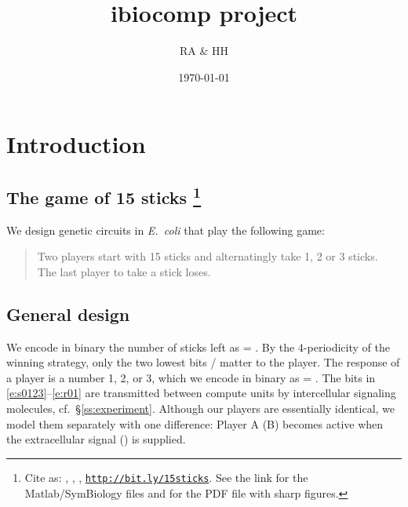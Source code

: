 \documentclass[12pt,notitlepage]{article}
\title{ibiocomp project}
\author{RA \& HH}
\date{\today}
\def\[#1\]{\begin{align}#1\end{align}}
\newcommand{\ra}[1]{{\color{Blue}#1}}
\newcommand{\linktodoc}{http://bit.ly/15sticks}
\begin{document}
\maketitle

\section{Introduction}

\subsection{The game of 15 sticks%
	\footnote{%
		Cite as:
		\MyTitle, \MyAuthor, \MyDate,
		\href{\linktodoc}{{\texttt{\linktodoc}}}.
		See the link 
		for the Matlab/SymBiology files
		and 
		for the PDF file with sharp figures.%
	}%
}


We design genetic circuits
\ra{in \emph{E.~coli}}
that play the following game:
%
\begin{quote}
	Two players start with 15 sticks
	and alternatingly 
	take 1, 2 or 3 sticks.
	\\
	The last player to take a stick loses.
\end{quote}



%



\subsection{General design} \label{s:general}

We encode in binary 
the number of sticks left as
\[
    \label{e:s0123}
     = 
    .
\]
%
%
By the 4-periodicity of the winning strategy,
only the two lowest bits /
matter to the player.
%
%
The response of a player is a number 1, 2, or 3,
which we encode in binary as
\[
    \label{e:r01}
     = 
    .
\]
%
The bits in \eqref{e:s0123}--\eqref{e:r01}
are transmitted 
between compute units
by 
intercellular signaling molecules,
cf.~\S\ref{ss:experiment}.
%
Although our players are essentially identical,
we model them separately with one difference:
Player A (B) becomes active when 
the extracellular signal  () is supplied.
\end{document}
